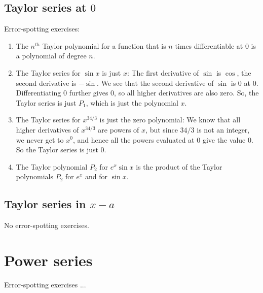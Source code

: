 \documentclass[10pt]{amsart}
\begin{document}
\subsection{Taylor series at $0$}

Error-spotting exercises:

\begin{enumerate}
\item The $n^{th}$ Taylor polynomial for a function that is $n$ times
  differentiable at $0$ is a polynomial of degree $n$.
\item The Taylor series for $\sin x$ is just $x$: The first derivative
  of $\sin$ is $\cos$, the second derivative is $-\sin$. We see that
  the second derivative of $\sin$ is $0$ at $0$. Differentiating $0$
  further gives $0$, so all higher derivatives are also zero. So, the
  Taylor series is just $P_1$, which is just the polynomial $x$.
\item The Taylor series for $x^{34/3}$ is just the zero polynomial: We
  know that all higher derivatives of $x^{34/3}$ are powers of $x$,
  but since $34/3$ is not an integer, we never get to $x^0$, and hence
  all the powers evaluated at $0$ give the value $0$. So the Taylor
  series is just $0$.
\item The Taylor polynomial $P_2$ for $e^x\sin x$ is the product of
  the Taylor polynomials $P_2$ for $e^x$ and for $\sin x$.
\end{enumerate}

\subsection{Taylor series in $x - a$}

No error-spotting exercises.

\section{Power series}

Error-spotting exercises ...
\end{document}

